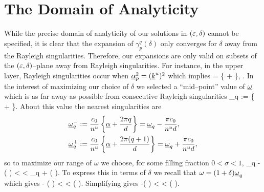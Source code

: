 \section{The Domain of Analyticity}
\label{Sec:Anal}

While the precise domain of analyticity of our solutions in $(\varepsilon,\delta)$ cannot be specified, it is clear that the expansion of $\gamma_p^q(\delta)$ only converges for $\delta$ away from the Rayleigh singularities. Therefore, our expansions are only valid on subsets of the $(\varepsilon,\delta)$--plane away from Rayleigh singularities. For instance, in the upper layer, Rayleigh singularities
occur when $\underline{\alpha}_p^2 = (\underline{k}^u)^2$ which implies
\be
\label{Eqn:Rayleigh:Sing}
\uomega = \pm {} \left\{ \ualpha + 
  \right\},
\quad
  .
\ee
In the interest of maximizing our choice of $\delta$ we selected
a ``mid--point'' value of $\underline{\omega}$ which is as far away as possible
from consecutive Rayleigh singularities
\be
\label{Eqn:uomegaq}
\uomega_q :=  \left\{ \ualpha 
  +  \right\}.
\ee
About this value the nearest singularities are
\begin{align*}
\underline{\omega}_q^- & := \frac{c_0}{n^u} \left\{ \underline{\alpha} 
  + \frac{2 \pi q}{d} \right\}
  = \underline{\omega}_q - \frac{\pi c_0}{n^u d},
\\
\underline{\omega}_q^+ & := \frac{c_0}{n^u} \left\{ \underline{\alpha} 
  + \frac{2 \pi (q+1)}{d} \right\}
  = \underline{\omega}_q + \frac{\pi c_0}{n^u d},
\end{align*}
so to maximize our range of $\omega$ we choose, for some
filling fraction $0 < \sigma < 1$,
\bes
\uomega_q - \sigma \left(  \right)
  < \omega < \uomega_q + \sigma \left(  \right).
\ees
To express this in terms of $\delta$ we recall that
$\omega = (1+\delta) \underline{\omega}_q$ which gives
\bes
- \sigma \left(  \right)
  < \delta < \sigma \left(  \right).
\ees
Simplifying gives
\be
\label{Eqn:uomega:Range}
-\left(  \right)
  < \delta < \left(  \right).
\ee